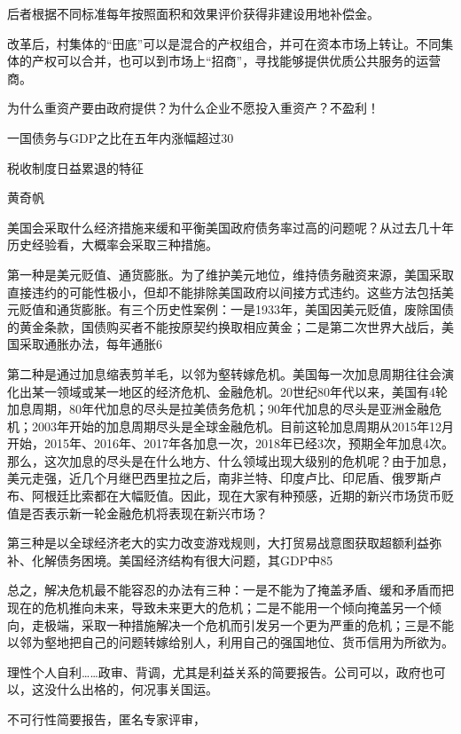 后者根据不同标准每年按照面积和效果评价获得非建设用地补偿金。

改革后，村集体的“田底”可以是混合的产权组合，并可在资本市场上转让。不同集体的产权可以合并，也可以到市场上“招商”，寻找能够提供优质公共服务的运营商。


为什么重资产要由政府提供？为什么企业不愿投入重资产？不盈利！

一国债务与GDP之比在五年内涨幅超过30%

税收制度日益累退的特征

黄奇帆

美国会采取什么经济措施来缓和平衡美国政府债务率过高的问题呢？从过去几十年历史经验看，大概率会采取三种措施。

第一种是美元贬值、通货膨胀。为了维护美元地位，维持债务融资来源，美国采取直接违约的可能性极小，但却不能排除美国政府以间接方式违约。这些方法包括美元贬值和通货膨胀。有三个历史性案例：一是1933年，美国因美元贬值，废除国债的黄金条款，国债购买者不能按原契约换取相应黄金；二是第二次世界大战后，美国采取通胀办法，每年通胀6%

第二种是通过加息缩表剪羊毛，以邻为壑转嫁危机。美国每一次加息周期往往会演化出某一领域或某一地区的经济危机、金融危机。20世纪80年代以来，美国有4轮加息周期，80年代加息的尽头是拉美债务危机；90年代加息的尽头是亚洲金融危机；2003年开始的加息周期尽头是全球金融危机。目前这轮加息周期从2015年12月开始，2015年、2016年、2017年各加息一次，2018年已经3次，预期全年加息4次。那么，这次加息的尽头是在什么地方、什么领域出现大级别的危机呢？由于加息，美元走强，近几个月继巴西里拉之后，南非兰特、印度卢比、印尼盾、俄罗斯卢布、阿根廷比索都在大幅贬值。因此，现在大家有种预感，近期的新兴市场货币贬值是否表示新一轮金融危机将表现在新兴市场？

第三种是以全球经济老大的实力改变游戏规则，大打贸易战意图获取超额利益弥补、化解债务困境。美国经济结构有很大问题，其GDP中85%

总之，解决危机最不能容忍的办法有三种：一是不能为了掩盖矛盾、缓和矛盾而把现在的危机推向未来，导致未来更大的危机；二是不能用一个倾向掩盖另一个倾向，走极端，采取一种措施解决一个危机而引发另一个更为严重的危机；三是不能以邻为壑地把自己的问题转嫁给别人，利用自己的强国地位、货币信用为所欲为。

理性个人自利……政审、背调，尤其是利益关系的简要报告。公司可以，政府也可以，这没什么出格的，何况事关国运。


不可行性简要报告，匿名专家评审，

